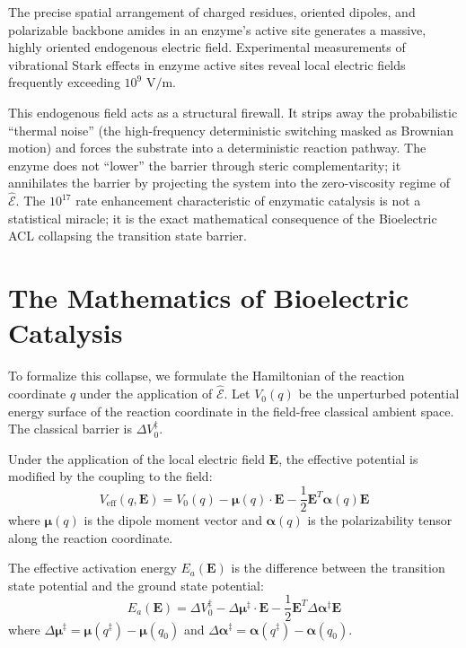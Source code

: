 \documentclass[11pt,openany]{extbook}
\theoremstyle{plain}
\theoremstyle{definition}
\begin{document}
The precise spatial arrangement of charged residues, oriented dipoles, and polarizable backbone amides in an enzyme's active site generates a massive, highly oriented endogenous electric field. Experimental measurements of vibrational Stark effects in enzyme active sites reveal local electric fields frequently exceeding $10^9\text{ V/m}$.

This endogenous field acts as a structural firewall. It strips away the probabilistic ``thermal noise'' (the high-frequency deterministic switching masked as Brownian motion) and forces the substrate into a deterministic reaction pathway. The enzyme does not ``lower'' the barrier through steric complementarity; it annihilates the barrier by projecting the system into the zero-viscosity regime of $\hat{\mathcal{E}}$. The $10^{17}$ rate enhancement characteristic of enzymatic catalysis is not a statistical miracle; it is the exact mathematical consequence of the Bioelectric ACL collapsing the transition state barrier.

\section{The Mathematics of Bioelectric Catalysis}

To formalize this collapse, we formulate the Hamiltonian of the reaction coordinate $q$ under the application of $\hat{\mathcal{E}}$. Let $V_0(q)$ be the unperturbed potential energy surface of the reaction coordinate in the field-free classical ambient space. The classical barrier is $\Delta V_0^{\ddagger}$.

Under the application of the local electric field $\mathbf{E}$, the effective potential is modified by the coupling to the field:
\[
V_{\text{eff}}(q, \mathbf{E}) = V_0(q) - \boldsymbol{\mu}(q) \cdot \mathbf{E} - \frac{1}{2} \mathbf{E}^T \boldsymbol{\alpha}(q) \mathbf{E}
\]
where $\boldsymbol{\mu}(q)$ is the dipole moment vector and $\boldsymbol{\alpha}(q)$ is the polarizability tensor along the reaction coordinate.

The effective activation energy $E_a(\mathbf{E})$ is the difference between the transition state potential and the ground state potential:
\[
E_a(\mathbf{E}) = \Delta V_0^{\ddagger} - \Delta \boldsymbol{\mu}^{\ddagger} \cdot \mathbf{E} - \frac{1}{2} \mathbf{E}^T \Delta \boldsymbol{\alpha}^{\ddagger} \mathbf{E}
\]
where $\Delta \boldsymbol{\mu}^{\ddagger} = \boldsymbol{\mu}(q^{\ddagger}) - \boldsymbol{\mu}(q_0)$ and $\Delta \boldsymbol{\alpha}^{\ddagger} = \boldsymbol{\alpha}(q^{\ddagger}) - \boldsymbol{\alpha}(q_0)$.
\end{document}
